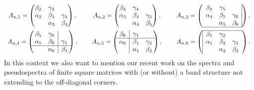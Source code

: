 \documentclass{article}
\numberwithin{equation}{section}   %
\numberwithin{figure}{section}  %
\begin{document}
\[
\begin{array}{ccc}
A_{n,1}=\begin{pmatrix} \beta_2&\gamma_3\\ \alpha_2&\beta_3&\gamma_4\\ &\alpha_3&\beta_4\end{pmatrix},\quad~
& 
A_{n,2}=\begin{pmatrix} \beta_3&\gamma_4\\ \alpha_3&\beta_4&\gamma_5\\ &\alpha_4&\beta_5\end{pmatrix},\quad~
& 
A_{n,3}=
\left(
\begin{array}{ccc|}
\beta_4&\gamma_5&\\ \alpha_4&\beta_5&\gamma_6\\ &\alpha_5&\beta_6\\\hline
\end{array}
\right)
,
\\[6mm]
A_{n,4}=%
\left(\!\!
\begin{array}{cc|c}
\beta_5&\gamma_6\\
\alpha_5&\beta_6&{\gamma_1}\\ \hline
&{\alpha_6}&\beta_1
\end{array}
\!\!\right)
,\quad~
& 
A_{n,5}=%
\left(\!\!
\begin{array}{c|cc}
\beta_6&{\gamma_1}\\ \hline
{\alpha_6}&\beta_1&\gamma_2\\
&\alpha_1&\beta_2
\end{array}
\!\!\right)
,\quad~
& 
A_{n,6}=%
\left(
\begin{array}{|ccc}
\hline
\beta_1&\gamma_2\\ \alpha_1&\beta_2&\gamma_3\\ &\alpha_2&\beta_3
\end{array}
\right)
.
\end{array}
\]
In this context we also want to mention our recent work \cite{CW.ML:finite} on the spectra and pseudospectra of finite square matrices with (or without) a band structure not extending to the off-diagonal corners.
\end{document}
